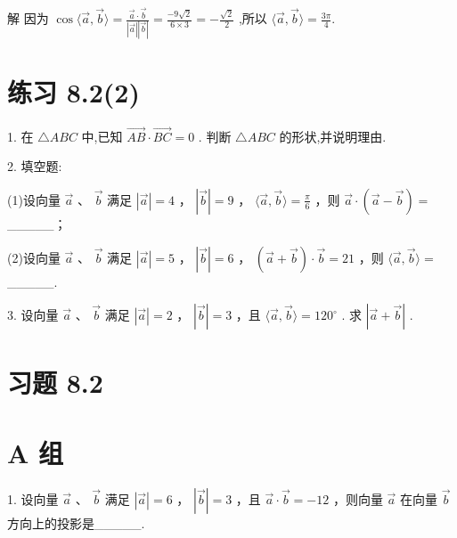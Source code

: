 \documentclass[10pt]{article}
\begin{document}
解 因为 \(\cos \langle \overrightarrow{a},\overrightarrow{b}\rangle  = \frac{\overrightarrow{a} \cdot  \overrightarrow{b}}{\left| \overrightarrow{a}\right| \left| \overrightarrow{b}\right| } = \frac{-9\sqrt{2}}{6 \times  3} =  - \frac{\sqrt{2}}{2}\) ,所以 \(\langle \overrightarrow{a},\overrightarrow{b}\rangle  = \frac{3\pi }{4}.\)

\section*{练习 8.2(2)}

1. 在 \(\bigtriangleup {ABC}\) 中,已知 \(\overrightarrow{AB} \cdot  \overrightarrow{BC} = 0\) . 判断 \(\bigtriangleup {ABC}\) 的形状,并说明理由.

2. 填空题:

(1)设向量 \(\overrightarrow{a}\) 、 \(\overrightarrow{b}\) 满足 \(\left| \overrightarrow{a}\right|  = 4\) ， \(\left| \overrightarrow{b}\right|  = 9\) ， \(\langle \overrightarrow{a},\overrightarrow{b}\rangle  = \frac{\pi }{6}\) ，则 \(\overrightarrow{a} \cdot  \left( {\overrightarrow{a} - \overrightarrow{b}}\right)  =\) \_\_\_\_\_；

(2)设向量 \(\overrightarrow{a}\) 、 \(\overrightarrow{b}\) 满足 \(\left| \overrightarrow{a}\right|  = 5\) ， \(\left| \overrightarrow{b}\right|  = 6\) ， \(\left( {\overrightarrow{a} + \overrightarrow{b}}\right)  \cdot  \overrightarrow{b} = {21}\) ，则 \(\langle \overrightarrow{a},\overrightarrow{b}\rangle  =\) \_\_\_\_\_.

3. 设向量 \(\overrightarrow{a}\) 、 \(\overrightarrow{b}\) 满足 \(\left| \overrightarrow{a}\right|  = 2\) ， \(\left| \overrightarrow{b}\right|  = 3\) ，且 \(\langle \overrightarrow{a},\overrightarrow{b}\rangle  = {120}^{ \circ  }\) . 求 \(\left| {\overrightarrow{a} + \overrightarrow{b}}\right|\) .

\section*{习题 8.2}

\section*{A 组}

1. 设向量 \(\overrightarrow{a}\) 、 \(\overrightarrow{b}\) 满足 \(\left| \overrightarrow{a}\right|  = 6\) ， \(\left| \overrightarrow{b}\right|  = 3\) ，且 \(\overrightarrow{a} \cdot  \overrightarrow{b} =  - {12}\) ，则向量 \(\overrightarrow{a}\) 在向量 \(\overrightarrow{b}\) 方向上的投影是\_\_\_\_\_.
\end{document}
